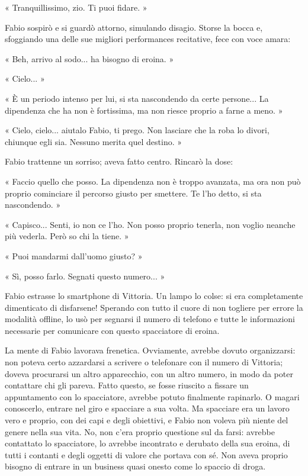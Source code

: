 « Tranquillissimo, zio. Ti puoi fidare. »

Fabio sospirò e si guardò attorno, simulando disagio. Storse la bocca e, sfoggiando una delle sue migliori performances recitative, fece con voce amara:

« Beh, arrivo al sodo... ha bisogno di eroina. »

« Cielo... »

« È un periodo intenso per lui, si sta nascondendo da certe persone... La dipendenza che ha non è fortissima, ma non riesce proprio a farne a meno. »

« Cielo, cielo... aiutalo Fabio, ti prego. Non lasciare che la roba lo divori, chiunque egli sia. Nessuno merita quel destino. »

Fabio trattenne un sorriso; aveva fatto centro. Rincarò la dose:

« Faccio quello che posso. La dipendenza non è troppo avanzata, ma ora non può proprio cominciare il percorso giusto per smettere. Te l'ho detto, si sta nascondendo. »

« Capisco... Senti, io non ce l'ho. Non posso proprio tenerla, non voglio neanche più vederla. Però so chi la tiene. »

« Puoi mandarmi dall'uomo giusto? »

« Sì, posso farlo. Segnati questo numero... »

Fabio estrasse lo smartphone di Vittoria. Un lampo lo colse: si era completamente dimenticato di disfarsene! Sperando con tutto il cuore di non togliere per errore la modalità offline, lo usò per segnarsi il numero di telefono e tutte le informazioni necessarie per comunicare con questo spacciatore di eroina.

La mente di Fabio lavorava frenetica. Ovviamente, avrebbe dovuto organizzarsi: non poteva certo azzardarsi a scrivere o telefonare con il numero di Vittoria; doveva procurarsi un altro apparecchio, con un altro numero, in modo da poter contattare chi gli pareva. Fatto questo, se fosse riuscito a fissare un appuntamento con lo spacciatore, avrebbe potuto finalmente rapinarlo. O magari conoscerlo, entrare nel giro e spacciare a sua volta. Ma spacciare era un lavoro vero e proprio, con dei capi e degli obiettivi, e Fabio non voleva più niente del genere nella sua vita. No, non c'era proprio questione sul da farsi: avrebbe contattato lo spacciatore, lo avrebbe incontrato e derubato della sua eroina, di tutti i contanti e degli oggetti di valore che portava con sé. Non aveva proprio bisogno di entrare in un business quasi onesto come lo spaccio di droga.

